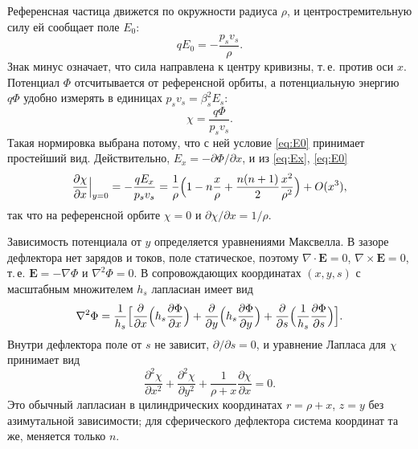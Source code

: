 Референсная частица движется по окружности радиуса $\rho$, и центростремительную силу ей сообщает поле $E_0$:
\begin{equation}
\label{eq:E0}
qE_0=-\frac{p_sv_s}{\rho}.
\end{equation}
Знак минус означает, что сила направлена к центру кривизны, т.\,е. против оси $x$. Потенциал $\Phi$ отсчитывается от референсной орбиты, а потенциальную энергию $q\Phi$ удобно измерять в единицах $p_sv_s=\beta_s^2E_s$:
\begin{equation}
\label{eq:psi-def}
\chi=\frac{q\Phi}{p_sv_s}.
\end{equation}
Такая нормировка выбрана потому, что с ней условие \eqref{eq:E0} принимает простейший вид. Действительно, $E_x=-\partial\Phi/\partial x$, и из \eqref{eq:Ex}, \eqref{eq:E0}
\begin{equation*}
\frac{\partial\chi}{\partial x}\Big|_{y=0}
=-\frac{qE_x}{p_sv_s}
=\frac{1}{\rho}\Bigl(1-n\frac{x}{\rho}+\frac{n(n+1)}{2}\frac{x^2}{\rho^2}\Bigr)+O(x^3),
\end{equation*}
так что на референсной орбите $\chi=0$ и $\partial\chi/\partial x=1/\rho$.

Зависимость потенциала от $y$ определяется уравнениями Максвелла. В зазоре дефлектора нет зарядов и токов, поле статическое, поэтому $\nabla\cdot\mathbf{E}=0$, $\nabla\times\mathbf{E}=0$, т.\,е. $\mathbf{E}=-\nabla\Phi$ и $\nabla^2\Phi=0$. В сопровождающих координатах $(x,y,s)$ с масштабным множителем $h_s$ лапласиан имеет вид
\begin{equation*}
\nabla^2\Phi=\frac{1}{h_s}\Bigl[
\frac{\partial}{\partial x}\Bigl(h_s\frac{\partial\Phi}{\partial x}\Bigr)
+\frac{\partial}{\partial y}\Bigl(h_s\frac{\partial\Phi}{\partial y}\Bigr)
+\frac{\partial}{\partial s}\Bigl(\frac{1}{h_s}\frac{\partial\Phi}{\partial s}\Bigr)\Bigr].
\end{equation*}
Внутри дефлектора поле от $s$ не зависит, $\partial/\partial s=0$, и уравнение Лапласа для $\chi$ принимает вид
\begin{equation}
\label{eq:laplace}
\frac{\partial^2\chi}{\partial x^2}
+\frac{\partial^2\chi}{\partial y^2}
+\frac{1}{\rho+x}\frac{\partial\chi}{\partial x}=0.
\end{equation}
Это обычный лапласиан в цилиндрических координатах $r=\rho+x$, $z=y$ без азимутальной зависимости; для сферического дефлектора система координат та же, меняется только $n$.

